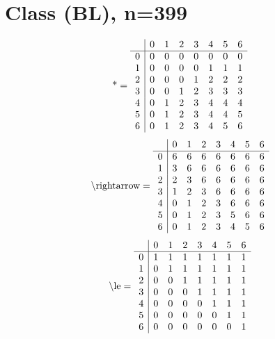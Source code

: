 \documentclass[11pt]{article}
\begin{document}
\section{Class (BL), n=399}
\[\text{*} = 
\begin{array}{r | r r r r r r r}
 & 0 & 1 & 2 & 3 & 4 & 5 & 6 \\ \hline
0 & 0 & 0 & 0 & 0 & 0 & 0 & 0 \\
1 & 0 & 0 & 0 & 0 & 1 & 1 & 1 \\
2 & 0 & 0 & 0 & 1 & 2 & 2 & 2 \\
3 & 0 & 0 & 1 & 2 & 3 & 3 & 3 \\
4 & 0 & 1 & 2 & 3 & 4 & 4 & 4 \\
5 & 0 & 1 & 2 & 3 & 4 & 4 & 5 \\
6 & 0 & 1 & 2 & 3 & 4 & 5 & 6 \\
\end{array}
\]
\[\text{\textbackslash rightarrow} = 
\begin{array}{r | r r r r r r r}
 & 0 & 1 & 2 & 3 & 4 & 5 & 6 \\ \hline
0 & 6 & 6 & 6 & 6 & 6 & 6 & 6 \\
1 & 3 & 6 & 6 & 6 & 6 & 6 & 6 \\
2 & 2 & 3 & 6 & 6 & 6 & 6 & 6 \\
3 & 1 & 2 & 3 & 6 & 6 & 6 & 6 \\
4 & 0 & 1 & 2 & 3 & 6 & 6 & 6 \\
5 & 0 & 1 & 2 & 3 & 5 & 6 & 6 \\
6 & 0 & 1 & 2 & 3 & 4 & 5 & 6 \\
\end{array}
\]
\[\text{\textbackslash le} = 
\begin{array}{r | r r r r r r r}
 & 0 & 1 & 2 & 3 & 4 & 5 & 6 \\ \hline
0 & 1 & 1 & 1 & 1 & 1 & 1 & 1 \\
1 & 0 & 1 & 1 & 1 & 1 & 1 & 1 \\
2 & 0 & 0 & 1 & 1 & 1 & 1 & 1 \\
3 & 0 & 0 & 0 & 1 & 1 & 1 & 1 \\
4 & 0 & 0 & 0 & 0 & 1 & 1 & 1 \\
5 & 0 & 0 & 0 & 0 & 0 & 1 & 1 \\
6 & 0 & 0 & 0 & 0 & 0 & 0 & 1 \\
\end{array}
\]
\end{document}
